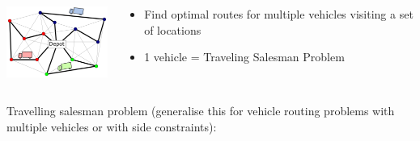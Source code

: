 \documentclass{cons-beamer}
\begin{document}
\begin{flashcardcpmpy}
\begin{frame}
  \begin{example}

    \begin{columns}
      \begin{column}{0.4\textwidth}        
        \centering
        \includegraphics[width=40mm]{images/VRP.png} \\
      \end{column}
      \begin{column}{0.6\textwidth}        
        \begin{itemize}
          \item Find optimal routes for multiple vehicles visiting a set of locations
          \item 1 vehicle = Traveling Salesman Problem
        \end{itemize}
      \end{column}
    \end{columns}
  \end{example}

    Travelling salesman problem (generalise this for vehicle
    routing problems with multiple vehicles or with side constraints):

    

\end{frame}
\end{flashcardcpmpy}
\end{document}
